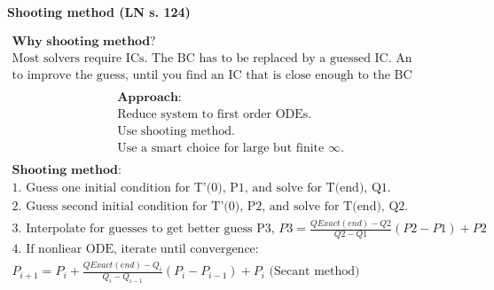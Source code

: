 \documentclass[10pt, a4paper]{article}
\begin{document}
\newpage
\begin{center}
    \Large
    \textbf{Shooting method (LN s. 124)}
    \vspace{0.5cm}
\end{center}
\begin{gather*}
    \textbf{Why shooting method?} \\
    \text{Most solvers require ICs. The BC has to be replaced by a guessed IC. An iterative process uses this guess} \\
    \text{to improve the guess, until you find an IC that is close enough to the BC prescribed.} \\ %
\end{gather*}
\begin{gather*}
    \textbf{Approach: } \\
    \text{Reduce system to first order ODEs.} \\
    \text{Use shooting method.} \\
    \text{Use a smart choice for large but finite $\infty$.} \\
\end{gather*}
\begin{gather*}
    \textbf{Shooting method: } \\
    \text{1. Guess one initial condition for T'(0), P1, and solve for T(end), Q1.} \\
    \text{2. Guess second initial condition for T'(0), P2, and solve for T(end), Q2.} \\ 
    \text{3. Interpolate for guesses to get better guess P3, } P3 = \frac{QExact(end)-Q2}{Q2-Q1}(P2-P1) + P2\\
    \text{4. If nonliear ODE, iterate until convergence:} \\
    P_{i+1} = P_i + \frac{QExact(end)-Q_i}{Q_i-Q_{i-1}}(P_i-P_{i-1}) + P_i \text{ (Secant method)}\\
\end{gather*}
\end{document}
